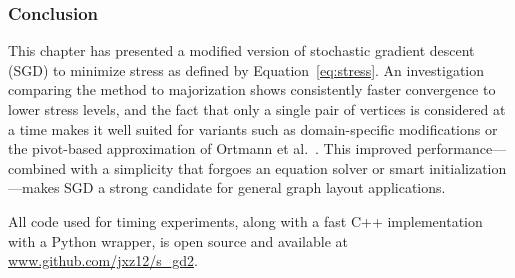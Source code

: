 \subsubsection{Conclusion}
This chapter has presented a modified version of stochastic gradient descent (SGD) to minimize stress as defined by Equation~\eqref{eq:stress}. An investigation comparing the method to majorization shows consistently faster convergence to lower stress levels, and the fact that only a single pair of vertices is considered at a time makes it well suited for variants such as domain-specific modifications or the pivot-based approximation of Ortmann et al.\ \cite{Ortmann2017}.
This improved performance---combined with a simplicity that forgoes an equation solver or smart initialization---makes
SGD a strong candidate for general graph layout applications.

All code used for timing experiments, along with a fast C++ implementation with a Python wrapper, is open source and available at \url{www.github.com/jxz12/s_gd2}.